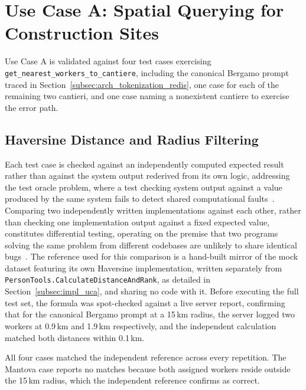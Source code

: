 \section{Use Case A: Spatial Querying for Construction Sites}
\label{sec:usecases_spatial_querying}

Use Case A is validated against four test cases exercising \texttt{get\_nearest\_workers\_to\_cantiere}, including the canonical Bergamo prompt traced in Section~\ref{subsec:arch_tokenization_redis}, one case for each of the remaining two cantieri, and one case naming a nonexistent cantiere to exercise the error path.

\subsection{Haversine Distance and Radius Filtering}
\label{subsec:usecases_haversine}

Each test case is checked against an independently computed expected result rather than against the system output rederived from its own logic, addressing the test oracle problem, where a test checking system output against a value produced by the same system fails to detect shared computational faults~\cite{barr2015oracle}. Comparing two independently written implementations against each other, rather than checking one implementation output against a fixed expected value, constitutes differential testing, operating on the premise that two programs solving the same problem from different codebases are unlikely to share identical bugs~\cite{mckeeman1998differential}. The reference used for this comparison is a hand-built mirror of the mock dataset featuring its own Haversine implementation, written separately from \texttt{PersonTools.CalculateDistanceAndRank}, as detailed in Section~\ref{subsec:impl_uca}, and sharing no code with it. Before executing the full test set, the formula was spot-checked against a live server report, confirming that for the canonical Bergamo prompt at a 15\,km radius, the server logged two workers at 0.9\,km and 1.9\,km respectively, and the independent calculation matched both distances within 0.1\,km.

All four cases matched the independent reference across every repetition. The Mantova case reports no matches because both assigned workers reside outside the 15\,km radius, which the independent reference confirms as correct.

